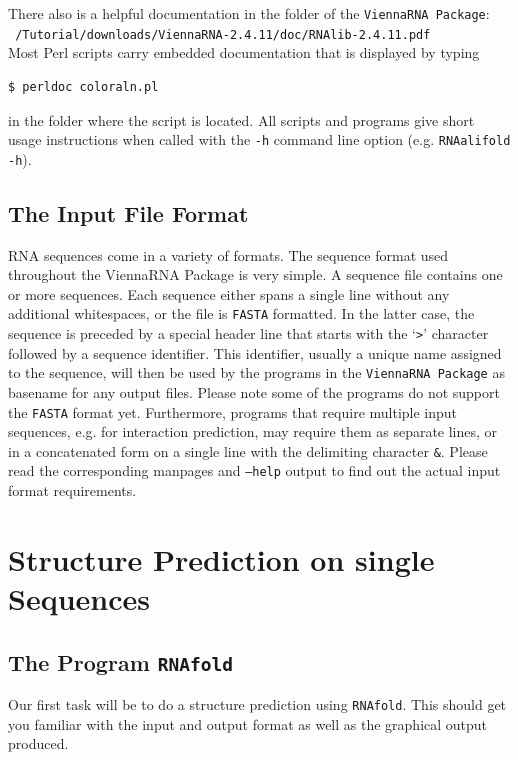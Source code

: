 \documentclass[a4paper]{article}
\begin{document}
There also is a helpful documentation in the folder of the \texttt{ViennaRNA Package}:\\
\texttt{~/Tutorial/downloads/ViennaRNA-2.4.11/doc/RNAlib-2.4.11.pdf}\\

Most Perl scripts carry embedded documentation that is displayed by typing 
\begin{verbatim}
$ perldoc coloraln.pl
\end{verbatim}%
in the folder where the script is located.
All scripts and programs give short usage instructions when called with
the \texttt{-h} command line option (e.g. \texttt{RNAalifold -h}).

\subsection{The Input File Format}
RNA sequences come in a variety of formats. The sequence format used
throughout the ViennaRNA Package is very simple. A sequence
file contains one or more sequences. Each sequence either spans a single
line without any additional whitespaces, or the file is \texttt{FASTA}
formatted. In the latter case, the sequence is preceded by a special header
line that starts with the `\texttt{>}' character followed by a sequence identifier.
This identifier, usually a unique name assigned to the sequence, will then be
used by the programs in the \texttt{ViennaRNA Package} as basename for any output
files. Please note some of the programs do not support the \texttt{FASTA} format
yet. Furthermore, programs that require multiple input sequences, e.g. for
interaction prediction, may require them as separate lines, or in a concatenated
form on a single line with the delimiting character \texttt{\&}. Please read
the corresponding manpages and \texttt{--help} output to find out the actual
input format requirements.

%
\section{Structure Prediction on single Sequences}
\subsection{The Program \texttt{RNAfold}}
Our first task will be to do a structure prediction using
\texttt{RNAfold}. This should get you familiar with the input and output
format as well as the graphical output produced.
\end{document}
